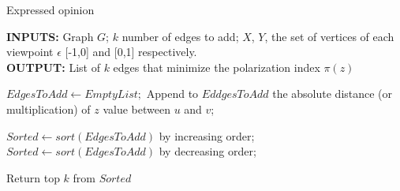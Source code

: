 \begin{algorithm}[H]
	\caption{Expressed opinion}
	\label{alg:expreDisMiss}
	
	\begin{flushleft}
        		\textbf{INPUTS:} Graph $G$; $k$ number of edges to add;
		$X$, $Y $, the set of vertices of each viewpoint $\epsilon$ [-1,0] and [0,1] respectively.\\
		\vspace{6pt}
        		\textbf{OUTPUT:} List of $k$ edges that minimize the polarization index $\pi(z)$
	\end{flushleft}
	
	\begin{algorithmic}[1]
		\STATE $EdgesToAdd \leftarrow Empty List;$
			\STATE Append to $EddgesToAdd$ the absolute distance (or multiplication) of $z$ value between $u$ and $v$;
		\ENDFOR
		
			\STATE $Sorted \leftarrow sort(EdgesToAdd)$ by increasing order;
		\ELSE 
			\STATE $Sorted \leftarrow sort(EdgesToAdd)$ by decreasing order;
		\ENDIF

		\STATE Return top $k$ from $Sorted$
	\end{algorithmic}
	
\end{algorithm}

\clearpage



